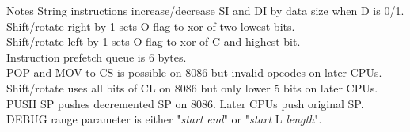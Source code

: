 \documentclass{sheet}
\begin{document}
\begin{multicols}{3}
\begin{table-X}{Notes}
String instructions increase/decrease SI and DI by data size when D is 0/1. \\
Shift/rotate right by 1 sets O flag to xor of two lowest bits. \\
Shift/rotate left by 1 sets O flag to xor of C and highest bit. \\
Instruction prefetch queue is 6 bytes. \\
POP and MOV to CS is possible on 8086 but invalid opcodes on later CPUs. \\
Shift/rotate uses all bits of CL on 8086 but only lower 5 bits on later CPUs. \\
PUSH SP pushes decremented SP on 8086. Later CPUs push original SP. \\
DEBUG range parameter is either "\emph{start} \emph{end}" or "\emph{start} L \emph{length}". \\
\end{table-X}
%
\end{multicols}
\end{document}
